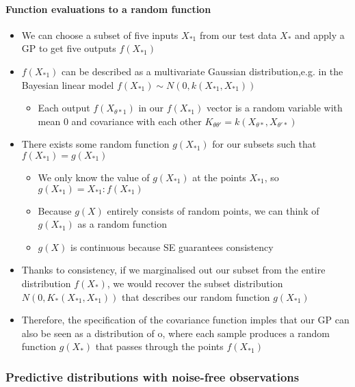 \documentclass[12pt]{article}
\begin{document}
\paragraph{Function evaluations to a random function}
\begin{itemize}
    \item We can choose a subset of five inputs $X_{*1}$ from our test data $X_*$ and apply a GP to get five outputs $f(X_{*1})$
    \item $f(X_{*1})$ can be described as a multivariate Gaussian distribution,e.g. in the Bayesian linear model $f(X_{*1}) \sim N(0, k(X_{*1}, X_{*1}))$ 
        \begin{itemize}
            \item Each output $f(X_{\theta*1})$ in our $f(X_{*1})$ vector is a random variable with mean $0$ and covariance with each other $K_{\theta\theta'} = k(X_{\theta*}, X_{\theta'*})$ 
        \end{itemize}
    \item There exists some random function $g(X_{*1})$ for our subsets such that $f(X_{*1}) = g(X_{*1})$
    \begin{itemize}
        \item We only know the value of $g(X_{*1})$ at the points $X_{*1}$, so $g(X_{*1}) = {X_{*1} : f(X_{*1})}$
        \item Because $g(X)$ entirely consists of random points, we can think of $g(X_{*1})$ as a random function
        \item $g(X)$ is continuous because SE guarantees consistency
    \end{itemize}
\item Thanks to consistency, if we marginalised out our subset from the entire distribution $f(X_*)$, we would recover the subset distribution $N(0, K_*(X_{*1}, X_{*1}))$ that describes our random function $g(X_{*1})$
    \item Therefore, the specification of the covariance function imples that our GP can also be seen as a distribution of o, where each sample produces a random function $g(X_*)$ that passes through the points $f(X_{*1})$
\end{itemize}


\subsubsection{Predictive distributions with noise-free observations}
\end{document}

